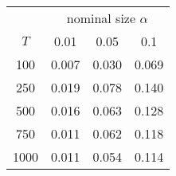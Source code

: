 % 
\begin{tabular}{cccc}
  \hline
  & \multicolumn{3}{c}{nominal size $\alpha$} \\
 $T$ & 0.01 & 0.05 & 0.1 \\
 \hline
100 & 0.007 & 0.030 & 0.069 \\ 
  250 & 0.019 & 0.078 & 0.140 \\ 
  500 & 0.016 & 0.063 & 0.128 \\ 
  750 & 0.011 & 0.062 & 0.118 \\ 
  1000 & 0.011 & 0.054 & 0.114 \\ 
   \hline
\end{tabular}
